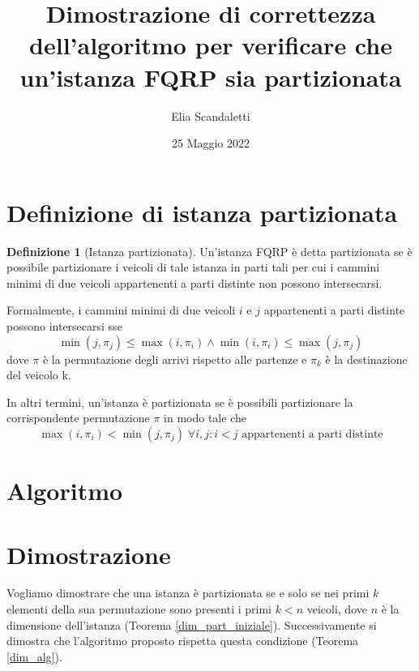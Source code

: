 \documentclass{article}
\title{Dimostrazione di correttezza dell'algoritmo per verificare che un'istanza FQRP sia partizionata}
\author{Elia Scandaletti}
\date{25 Maggio 2022}
\theoremstyle{definition}
\newtheorem{definition}{Definizione}
\begin{document}
\maketitle

\tableofcontents

\clearpage

\section{Definizione di istanza partizionata}
\begin{definition}[Istanza partizionata]\label{def_part}
    Un'istanza FQRP è detta partizionata se è possibile partizionare i veicoli di tale istanza in parti tali per cui i cammini minimi di due veicoli appartenenti a parti distinte non possono intersecarsi.
\end{definition}
Formalmente, i cammini minimi di due veicoli $i$ e $j$ appartenenti a parti distinte possono intersecarsi sse
\[ \min(j, \pi_j) \leq \max(i, \pi_i) \wedge \min(i, \pi_i) \leq \max(j, \pi_j) \]
dove $\pi$ è la permutazione degli arrivi rispetto alle partenze e $\pi_k$ è la destinazione del veicolo k.

In altri termini, un'istanza è partizionata se è possibili partizionare la corrispondente permutazione $\pi$ in modo tale che
\begin{equation}
    \label{cond_part}
    \max(i, \pi_i) < \min(j, \pi_j)\;\forall i, j : i < j \mbox{ appartenenti a parti distinte}
\end{equation}

\section{Algoritmo}


\section{Dimostrazione}
Vogliamo dimostrare che una istanza è partizionata se e solo se nei primi $k$ elementi della sua permutazione sono presenti i primi $k < n$ veicoli, dove $n$ è la dimensione dell'istanza (Teorema \ref{dim_part_iniziale}).
Successivamente si dimostra che l'algoritmo proposto rispetta questa condizione (Teorema \ref{dim_alg}).
\end{document}
